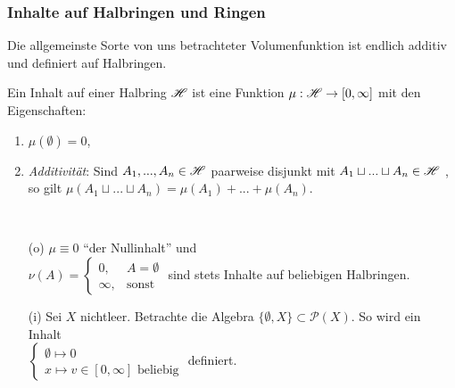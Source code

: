 \subsubsection{Inhalte auf Halbringen und Ringen}
Die allgemeinste Sorte von uns betrachteter Volumenfunktion ist endlich additiv und definiert auf Halbringen.

\begin{definition}
\begin{mdframed}
Ein Inhalt auf einer Halbring $\mathscr{H}$ ist eine Funktion $\mu: \mathscr{H} \to [0,\infty]$ mit den Eigenschaften:
\begin{enumerate}[(\roman*),topsep=5pt, itemsep = 0 pt]
	\item $\mu (\emptyset) = 0$,
	\item \emph{Additivität}: Sind $A_1,...,A_n \in \mathscr{H}$ paarweise disjunkt mit $A_1 \sqcup ... \sqcup A_n \in \mathscr{H}$ , so gilt $\mu(A_1 \sqcup ... \sqcup A_n) = \mu(A_1) + ... +\mu(A_n)$.
\end{enumerate}
\end{mdframed}
\end{definition}

\begin{example} \
\begin{enumerate}
	\item[(o)] $\mu \equiv 0$ ``der Nullinhalt'' und\\
				$\nu(A) = \begin{cases}
					0,       & A = \emptyset \\
					\infty, & \text{sonst}
				\end{cases}$
				sind stets Inhalte auf beliebigen Halbringen.
	\item[(i)] Sei $X$ nichtleer. Betrachte die Algebra $\{ \emptyset, X\} \subset \mathcal{P}(X)$. So wird ein Inhalt \\
			$\begin{cases}
				\emptyset \mapsto 0 \\
				x \mapsto v \in [0,\infty] \text{ beliebig}
			\end{cases}$
			definiert.
\end{enumerate}
\end{example}

